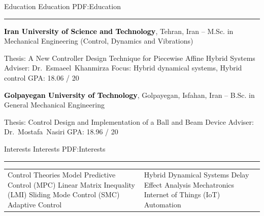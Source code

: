 \documentclass[letterpaper,MMMyyyy,nonstopmode]{ResumeTemplate}
\begin{document}
\begin{Body}


\Section
{Education}
{Education}
{PDF:Education}
\textcolor{Forestg}{\vspace{0.05cm}\hrule height 0.1cm}\BigGap
\Entry
{\textcolor{black}{\textbf{Iran University of Science and Technology}}, Tehran, Iran}
\hfill
{ --
	}
\Gap
\BulletItem
M.Sc. in
{Mechanical Engineering \small{(Control, Dynamics and Vibrations)}}

\begin{Detail}
\SubBulletItem
Thesis:
{A New Controller Design Technique for Piecewise Affine Hybrid Systems}
\SubBulletItem
Adviser:
Dr.~Esmaeel~Khanmirza
\SubBulletItem
Focus:
Hybrid dynamical systems, Hybrid control
\SubBulletItem
GPA: 18.06 / 20
\end{Detail}


\BigGap
\Entry
{\textcolor{black}{\textbf{Golpayegan University of Technology}},
Golpayegan, Isfahan, Iran}
\hfill
{} --
\Gap
\BulletItem
B.Sc. in
{General Mechanical Engineering}

\begin{Detail}
\SubBulletItem
Thesis: Control Design and Implementation of a Ball and Beam Device
\SubBulletItem
Adviser:
Dr.~Mostafa~Nasiri
\SubBulletItem
GPA: 18.96 / 20
\end{Detail}



\Section
{Interests}
{Interests}
{PDF:Interests}
\textcolor{Forestg}{\vspace{0.05cm}\hrule height 0.1cm}\BigGap
\Entry

\begin{center}
	\begin{tabular}{ m{8cm} m{8cm} }
		\BulletItem
		Control Theories
		\SubBulletItem
		Model Predictive Control (MPC)
		\SubBulletItem
		Linear Matrix Inequality (LMI)
		\SubBulletItem
		Sliding Mode Control (SMC)
		\SubBulletItem
		Adaptive Control & \BulletItem
		Hybrid Dynamical Systems
		\BulletItem
		Delay Effect Analysis
		\BulletItem
		Mechatronics
		\BulletItem
		Internet of Things (IoT)
		\BulletItem
		Automation
	\end{tabular}
\end{center}




\end{Body}
\end{document}
